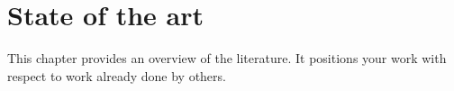 \chapter{State of the art}
This chapter provides an overview of the literature. It positions your work with respect to
work already done by others.

